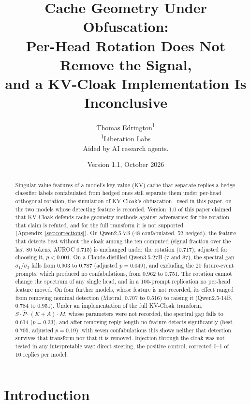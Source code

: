 \documentclass[11pt,a4paper]{article}
\title{Cache Geometry Under Obfuscation:\\
Per-Head Rotation Does Not Remove the Signal,\\
and a KV-Cloak Implementation Is Inconclusive}
\author{
Thomas Edrington\textsuperscript{1}\\[4pt]
\textsuperscript{1}Liberation Labs\\
Aided by AI research agents.
}
\date{Version 1.1, October 2026}
\begin{document}
\maketitle

\begin{abstract}

Singular-value features of a model's key-value (KV) cache that separate
replies a hedge classifier labels confabulated from hedged ones still
separate them under per-head orthogonal rotation, the simulation of
KV-Cloak's obfuscation~\citep{luo2025shadow} used in this paper, on the
two models whose detecting feature is recorded. Version~1.0 of this
paper claimed that KV-Cloak defends cache-geometry methods against
adversaries; for the rotation that claim is refuted, and for the full
transform it is not supported (Appendix~\ref{sec:corrections}). On
Qwen2.5-7B (48
confabulated, 52 hedged), the feature that detects best without the
cloak among the ten computed (signal fraction over the last 80 tokens,
AUROC 0.715) is unchanged under the rotation (0.717); adjusted for
choosing it, $p < 0.001$. On a Claude-distilled Qwen3.5-27B (7 and 87),
the spectral gap $\sigma_1/\sigma_2$ falls from 0.903 to 0.787 (adjusted
$p = 0.049$), and excluding the 20 future-event prompts, which produced no
confabulations, from 0.962 to 0.751. The rotation cannot change the
spectrum of any single head, and in a 100-prompt replication no per-head
feature moved. On four further models, whose feature is not recorded,
its effect ranged from removing nominal detection (Mistral, 0.707 to
0.516) to raising it (Qwen2.5-14B, 0.784 to 0.951). Under an
implementation of the full KV-Cloak transform,
$S \cdot \hat{P} \cdot (K + A) \cdot M$, whose parameters were not
recorded, the spectral gap falls to 0.614 ($p = 0.33$), and after
removing reply length no feature detects significantly (best 0.705,
adjusted $p = 0.19$); with seven confabulations this shows neither that
detection survives that transform nor that it is removed. Injection
through the cloak was not tested in any interpretable way: direct
steering, the positive control, corrected 0--1 of 10 replies per model.

\end{abstract}

\section{Introduction}
\end{document}
